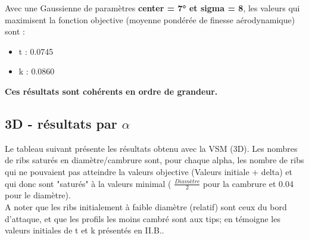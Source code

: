 \documentclass[conference]{IEEEtran}
\begin{document}
    Avec une Gaussienne de paramètres \textbf{center = 7° et sigma = 8}, les valeurs qui maximisent la fonction objective (moyenne pondérée de finesse aérodynamique) sont :
    \begin{itemize}
        \item t : 0.0745
        \item k : 0.0860
    \end{itemize}
    \textbf{Ces résultats sont cohérents en ordre de grandeur.}

\subsection{3D - résultats par $\alpha$}

Le tableau suivant présente les résultats obtenu avec la VSM (3D). Les nombres de ribs saturés en diamètre/cambrure sont, pour chaque alpha, les nombre de ribs qui ne pouvaient pas atteindre la valeurs objective (Valeurs initiale + delta) et qui donc sont "saturés" à la valeurs minimal ( $\frac{Diamètre}{2}$ pour la cambrure et 0.04 pour le diamètre).\\

A noter que les ribs initialement à faible diamètre (relatif) sont ceux du bord d'attaque, et que les profils les moins cambré sont aux tips; en témoigne les valeurs initiales de t et k présentés en II.B..
\end{document}
